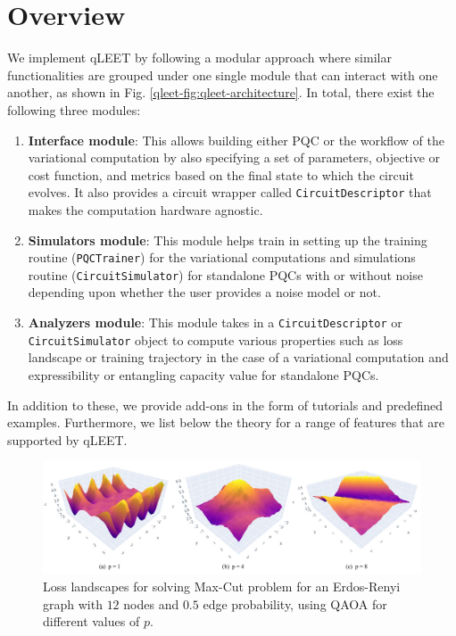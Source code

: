 \section{Overview}

We implement qLEET by following a modular approach where similar functionalities are grouped under one single module that can interact with one another, as shown in Fig. \ref{qleet-fig:qleet-architecture}. In total, there exist the following three modules:
\begin{enumerate}
	\item \textbf{Interface module}: This allows building either PQC or the workflow of the variational computation by also specifying a set of parameters, objective or cost function, and metrics based on the final state to which the circuit evolves. It also provides a circuit wrapper called \texttt{CircuitDescriptor} that makes the computation hardware agnostic. 
	\item \textbf{Simulators module}: This module helps train in setting up the training routine (\texttt{PQCTrainer}) for the variational computations and simulations routine (\texttt{CircuitSimulator}) for standalone PQCs with or without noise depending upon whether the user provides a noise model or not.
	\item \textbf{Analyzers module}: This module takes in a \texttt{CircuitDescriptor} or \texttt{CircuitSimulator} object to compute various properties such as loss landscape or training trajectory in the case of a variational computation and expressibility or entangling capacity value for standalone PQCs.
\end{enumerate}

In addition to these, we provide add-ons in the form of tutorials and predefined examples. Furthermore, we list below the theory for a range of features that are supported by qLEET.

\begin{figure}[!tp]
    \centering
    \includegraphics[width=\linewidth]{figures/qleet/loss-landscape.pdf}
    \caption[Loss landscapes for QAOA]{Loss landscapes for solving Max-Cut problem for an Erdos-Renyi graph with $12$ nodes and $0.5$ edge probability, using QAOA for different values of $p$.}
    \label{fig:qleet-loss}
\end{figure}

